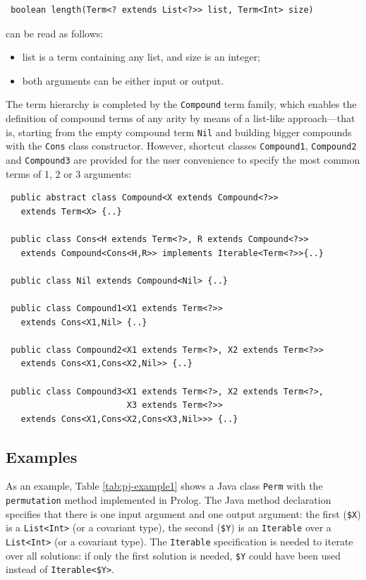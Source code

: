 \begin{verbatim}
 boolean length(Term<? extends List<?>> list, Term<Int> size)
\end{verbatim}

\noindent can be read as follows:

\begin{itemize}
  \item list is a term containing any list, and size is an integer;

  \item both arguments can be either input or output.
\end{itemize}

\noindent The term hierarchy is completed by the \texttt{Compound} term family, which enables the definition of compound terms of any arity by means of a list-like approach---that is, starting from the empty compound term \texttt{Nil} and building bigger compounds with the \texttt{Cons} class constructor.
However, shortcut classes \texttt{Compound1}, \texttt{Compound2} and \texttt{Compound3} are provided for the user convenience to specify the most common terms of 1, 2 or 3 arguments:

\begin{verbatim}
 public abstract class Compound<X extends Compound<?>>
   extends Term<X> {..}

 public class Cons<H extends Term<?>, R extends Compound<?>>
   extends Compound<Cons<H,R>> implements Iterable<Term<?>>{..}

 public class Nil extends Compound<Nil> {..}

 public class Compound1<X1 extends Term<?>>
   extends Cons<X1,Nil> {..}

 public class Compound2<X1 extends Term<?>, X2 extends Term<?>>
   extends Cons<X1,Cons<X2,Nil>> {..}

 public class Compound3<X1 extends Term<?>, X2 extends Term<?>,
                        X3 extends Term<?>>
   extends Cons<X1,Cons<X2,Cons<X3,Nil>>> {..}
\end{verbatim}

\subsection{Examples}
\label{ssec:p@j-examples}

As an example, Table \ref{tab:pj-example1} shows a Java class \texttt{Perm} with the \texttt{permutation} method implemented in Prolog.
%
The Java method declaration specifies that there is one input argument and one output argument: the first (\texttt{\$X}) is a \texttt{List<Int>} (or a covariant type), the second (\texttt{\$Y}) is an \texttt{Iterable} over a \texttt{List<Int>} (or a covariant type).
The \texttt{Iterable} specification is needed to iterate over all solutions: if only the first solution is needed, \texttt{\$Y} could have been used instead of \texttt{Iterable<\$Y>}.

